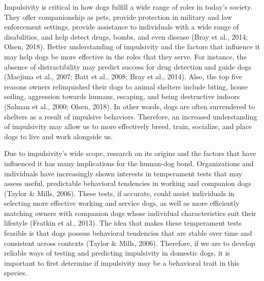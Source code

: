 \documentclass[
  ,pub,floatsintext]{apa6}
\begin{document}
Impulsivity is critical in how dogs fulfill a wide range of roles in today's society. They offer companionship as pets, provide protection in military and law enforcement settings, provide assistance to individuals with a wide range of disabilities, and help detect drugs, bombs, and even disease (Bray et al., 2014; Olsen, 2018). Better understanding of impulsivity and the factors that influence it may help dogs be more effective in the roles that they serve. For instance, the absence of distractibility may predict success for drug detection and guide dogs (Maejima et al., 2007; Batt et al., 2008; Bray et al., 2014). Also, the top five reasons owners relinquished their dogs to animal shelters include biting, house soiling, aggression towards humans, escaping, and being destructive indoors (Salman et al., 2000; Olsen, 2018). In other words, dogs are often surrendered to shelters as a result of impulsive behaviors. Therefore, an increased understanding of impulsivity may allow us to more effectively breed, train, socialize, and place dogs to live and work alongside us.

Due to impulsivity's wide scope, research on its origins and the factors that have influenced it has many implications for the human-dog bond. Organizations and individuals have increasingly shown interests in temperament tests that may assess useful, predictable behavioral tendencies in working and companion dogs (Taylor \& Mills, 2006). These tests, if accurate, could assist individuals in selecting more effective working and service dogs, as well as more efficiently matching owners with companion dogs whose individual characteristics suit their lifestyle (Fratkin et al., 2013). The idea that makes these temperament tests feasible is that dogs possess behavioral tendencies that are stable over time and consistent across contexts (Taylor \& Mills, 2006). Therefore, if we are to develop reliable ways of testing and predicting impulsivity in domestic dogs, it is important to first determine if impulsivity may be a behavioral trait in this species.
\end{document}
